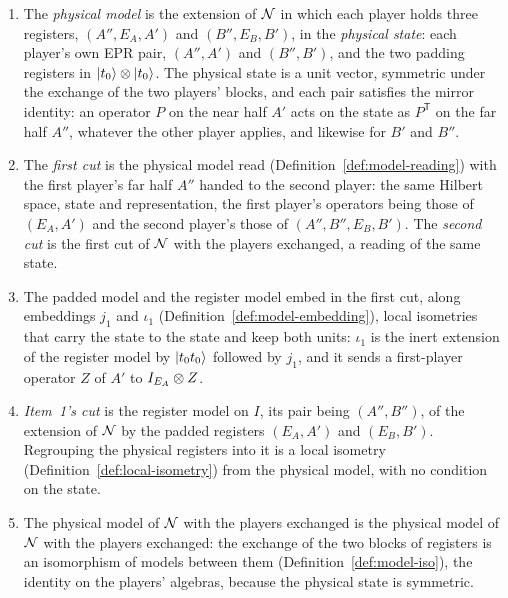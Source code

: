\begin{definition}
\begin{enumerate}
  Up to the associativity of extensions it is the extension of $\cal{N}$ by the registers
  $(E_A, A')$ and $(E_B, A'')$ in the unit vector $\ket{t_0 t_0} \ot \ket{\EPR_I}$, so the seeded
  CL test is sound in it (Definition~\ref{def:lidt-sound-in}) whenever it is sound in every
  extension of $\cal{N}$ by a unit vector, and then also in the padded model of $\cal{N}$ with the
  players exchanged.
\item The \emph{physical model} is the extension of $\cal{N}$ in which each player holds three
  registers, $(A'', E_A, A')$ and $(B'', E_B, B')$, in the \emph{physical state}: each player's
  own EPR pair, $(A'', A')$ and $(B'', B')$, and the two padding registers in
  $|t_0\rangle \otimes |t_0\rangle$. The physical state is a unit vector, symmetric under the exchange of
  the two players' blocks, and each pair satisfies the mirror identity: an operator $P$ on the near
  half $A'$ acts on the state as $P^{\mathsf T}$ on the far half $A''$, whatever the other player
  applies, and likewise for $B'$ and $B''$.
\item The \emph{first cut} is the physical model read (Definition~\ref{def:model-reading}) with the
  first player's far half $A''$ handed to the second player: the same Hilbert space, state and
  representation, the first player's
  operators being those of $(E_A, A')$ and the second player's those of $(A'', B'', E_B, B')$. The
  \emph{second cut} is the first cut of $\cal{N}$ with the players exchanged, a reading of the same
  state.
\item The padded model and the register model embed in the first cut, along embeddings $j_1$ and
  $\iota_1$ (Definition~\ref{def:model-embedding}), local isometries that carry the state to the
  state and keep both units: $\iota_1$ is the inert extension of the register model by
  $|t_0 t_0\rangle$ followed by $j_1$, and it sends a first-player operator $Z$ of $A'$ to
  $I_{E_A} \otimes Z$.
\item \emph{Item~1's cut} is the register model on $I$, its pair being $(A'', B'')$, of the
  extension of $\cal{N}$ by the padded registers $(E_A, A')$ and $(E_B, B')$. Regrouping the
  physical registers into it is a local isometry (Definition~\ref{def:local-isometry}) from the
  physical model, with no condition on the state.
\item The physical model of $\cal{N}$ with the players exchanged is the physical model of $\cal{N}$
  with the players exchanged: the exchange of the two blocks of registers is an isomorphism of
  models between them (Definition~\ref{def:model-iso}), the identity on the players' algebras,
  because the physical state is symmetric.
\end{enumerate}
\end{definition}

